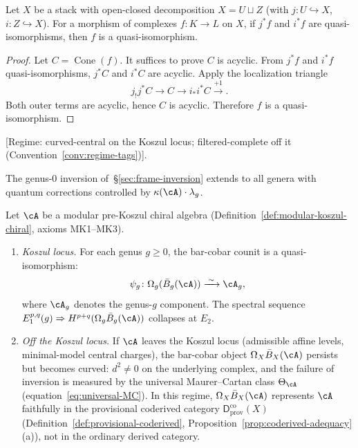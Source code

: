 \begin{lemma}\label{lem:extension-across-boundary-qi}
Let $X$ be a stack with open-closed decomposition $X = U \sqcup Z$ (with
$j:U\hookrightarrow X$, $i:Z\hookrightarrow X$). For a morphism of complexes
$f:K\to L$ on $X$, if $j^*f$ and $i^*f$ are quasi-isomorphisms, then $f$ is a
quasi-isomorphism.
\end{lemma}

\begin{proof}
Let $C=\operatorname{Cone}(f)$. It suffices to prove $C$ is acyclic.
From $j^*f$ and $i^*f$ quasi-isomorphisms, $j^*C$ and $i^*C$ are acyclic.
Apply the localization triangle
\[j_!j^*C \longrightarrow C \longrightarrow i_*i^*C \xrightarrow{+1}.\]
Both outer terms are acyclic, hence $C$ is acyclic. Therefore $f$ is a
quasi-isomorphism.
\end{proof}

\begin{theorem}\label{thm:higher-genus-inversion}
\textup{[}Regime: curved-central on the Koszul locus;
filtered-complete off it
\textup{(}Convention~\textup{\ref{conv:regime-tags})].}

\smallskip\noindent
The genus-$0$ inversion of~\S\ref{sec:frame-inversion} extends to all genera with quantum corrections controlled by $\kappa(\cA) \cdot \lambda_g$.

Let $\cA$ be a modular pre-Koszul chiral algebra
\textup{(}Definition~\textup{\ref{def:modular-koszul-chiral}},
axioms \textup{MK1--MK3)}.
\begin{enumerate}[label=\textup{(\alph*)}]
\item \emph{Koszul locus.}
For each genus $g \geq 0$, the bar-cobar counit is a
quasi-isomorphism:
\[\psi_g \colon \Omega_g(\bar{B}_g(\cA))
\xrightarrow{\;\sim\;} \cA_g,\]
where $\cA_g$ denotes the genus-$g$ component.
The spectral sequence $E_1^{p,q}(g) \Rightarrow
H^{p+q}(\Omega_g \bar{B}_g(\cA))$ collapses at $E_2$.

\item \emph{Off the Koszul locus.}
If $\cA$ leaves the Koszul locus \textup{(}admissible affine levels,
minimal-model central charges\textup{)}, the bar-cobar object
$\Omega_X \bar{B}_X(\cA)$ persists but becomes curved: $d^2 \neq 0$
on the underlying complex, and the failure of inversion is
measured by the universal Maurer--Cartan class $\Theta_{\cA}$
\textup{(}equation~\eqref{eq:universal-MC}\textup{)}.
In this regime, $\Omega_X \bar{B}_X(\cA)$ represents $\cA$
faithfully in the provisional coderived category
$\mathsf{D}^{\mathrm{co}}_{\mathrm{prov}}(X)$
\textup{(}Definition~\textup{\ref{def:provisional-coderived},}
Proposition~\textup{\ref{prop:coderived-adequacy}(a))},
not in the ordinary derived category.
\end{enumerate}
\end{theorem}

